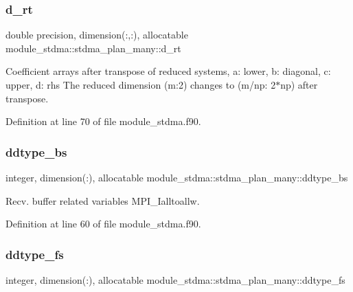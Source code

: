 \subsubsection{\texorpdfstring{d\_rt}{d\_rt}}
{\footnotesize\ttfamily double precision, dimension(\+:,\+:), allocatable module\+\_\+stdma\+::stdma\+\_\+plan\+\_\+many\+::d\+\_\+rt}



Coefficient arrays after transpose of reduced systems, a\+: lower, b\+: diagonal, c\+: upper, d\+: rhs The reduced dimension (m\+:2) changes to (m/np\+: 2$\ast$np) after transpose. 



Definition at line 70 of file module\+\_\+stdma.\+f90.

\mbox{\label{structmodule__stdma_1_1stdma__plan__many_a264b748ea3feb795c3531d3d1f004bc8}} 
\subsubsection{\texorpdfstring{ddtype\_bs}{ddtype\_bs}}
{\footnotesize\ttfamily integer, dimension(\+:), allocatable module\+\_\+stdma\+::stdma\+\_\+plan\+\_\+many\+::ddtype\+\_\+bs}



Recv. buffer related variables M\+P\+I\+\_\+\+Ialltoallw. 



Definition at line 60 of file module\+\_\+stdma.\+f90.

\mbox{\label{structmodule__stdma_1_1stdma__plan__many_a0d3ca6c89a9c1d47cc2e0df0a3160c08}} 
\subsubsection{\texorpdfstring{ddtype\_fs}{ddtype\_fs}}
{\footnotesize\ttfamily integer, dimension(\+:), allocatable module\+\_\+stdma\+::stdma\+\_\+plan\+\_\+many\+::ddtype\+\_\+fs}



